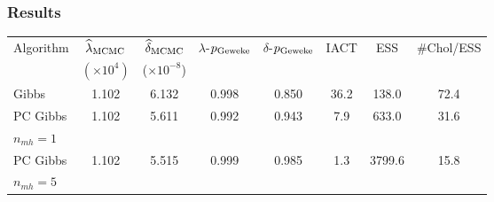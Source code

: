 \documentclass[]{beamer}
\renewcommand{\hat}{\widehat}
\begin{document}
\begin{frame}[t]
  \frametitle{Results}

\vspace{3em}

{\tiny
  \begin{tabular}{l|ccccccc}
    \hline
    Algorithm       & $\hat{\lambda}_{\rm MCMC}$& $\hat{\delta}_{\rm MCMC}$  & $\lambda$-$p_{\rm Geweke}$&$\delta$-$p_{\rm Geweke}$& IACT & ESS    & \#Chol/ESS \\
     & $(\times 10^{4})$ & ($\times 10^{-8}$) & & \\
    \hline
   Gibbs &                 1.102 &                 6.132 &                   0.998 &                    0.850& 36.2 &  138.0 &      \alert{72.4} \\
PC Gibbs &                 1.102 &                 5.611 &                   0.992 &                    0.943&  7.9 &  633.0 &      \alert{31.6} \\
\hspace{.2in} $n_{mh}= 1$ & & & & & & & \\
PC Gibbs &                 1.102 &                 5.515 &                   0.999 &                    0.985&  1.3 & 3799.6 &      \alert{15.8} \\
\hspace{.2in} $n_{mh}= 5$ & & & & & & & \\
    \hline
  \end{tabular}
}

\end{frame}
\end{document}
